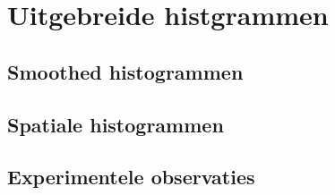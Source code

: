 


\section{Uitgebreide histgrammen}

\subsection{Smoothed histogrammen}

\subsection{Spatiale histogrammen}

\subsection{Experimentele observaties}